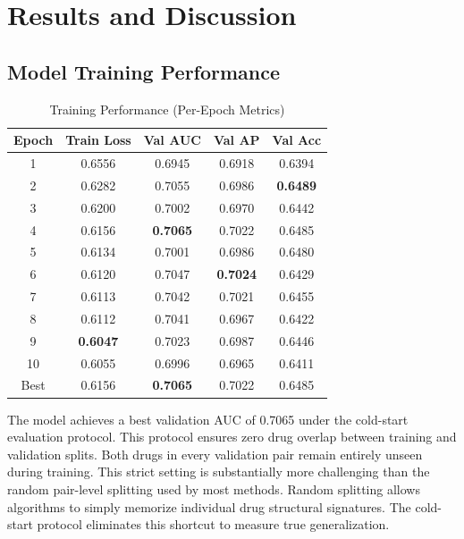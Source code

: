 \documentclass[conference]{IEEEtran}
\begin{document}
\section{Results and Discussion}

\subsection{Model Training Performance}

\begin{table}[htbp]
\caption{Training Performance (Per-Epoch Metrics)}
\label{tab:epoch_metrics}
\centering
\begin{tabular}{@{}ccccc@{}}
\toprule
\textbf{Epoch} & \textbf{Train Loss} & \textbf{Val AUC} & \textbf{Val AP} & \textbf{Val Acc} \\
\midrule
1  & 0.6556 & 0.6945 & 0.6918 & 0.6394 \\
2  & 0.6282 & 0.7055 & 0.6986 & \textbf{0.6489} \\
3  & 0.6200 & 0.7002 & 0.6970 & 0.6442 \\
4  & 0.6156 & \textbf{0.7065} & 0.7022 & 0.6485 \\
5  & 0.6134 & 0.7001 & 0.6986 & 0.6480 \\
6  & 0.6120 & 0.7047 & \textbf{0.7024} & 0.6429 \\
7  & 0.6113 & 0.7042 & 0.7021 & 0.6455 \\
8  & 0.6112 & 0.7041 & 0.6967 & 0.6422 \\
9  & \textbf{0.6047} & 0.7023 & 0.6987 & 0.6446 \\
10 & 0.6055 & 0.6996 & 0.6965 & 0.6411 \\
\midrule
Best & 0.6156 & \textbf{0.7065} & 0.7022 & 0.6485 \\
\bottomrule
\end{tabular}
\end{table}


The model achieves a best validation AUC of 0.7065 under the cold-start evaluation protocol. This protocol ensures zero drug overlap between training and validation splits. Both drugs in every validation pair remain entirely unseen during training. This strict setting is substantially more challenging than the random pair-level splitting used by most methods. Random splitting allows algorithms to simply memorize individual drug structural signatures. The cold-start protocol eliminates this shortcut to measure true generalization.
\end{document}
